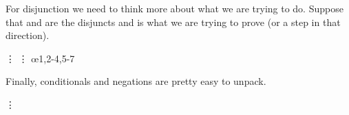 \begin{fitchrule}
  \label{def:unpacking-conjunctions}
  \leavevmode
  \vspace{-0.9\baselineskip}
  \begin{fitchproof}
     {\ephi\eand\epsi} 
     {\ephi}
     {\epsi}
  \end{fitchproof}  
\end{fitchrule}

For disjunction we need to think more about what we are trying to do. Suppose
that \ephi and \epsi are the disjuncts and \echi is what we are trying to
prove (or a step in that direction).

\begin{fitchrule}
  \label{def:unpacking-disjunctions}
  \leavevmode
  \vspace{-0.9\baselineskip}
  \begin{fitchproof}
     {\ephi\eor\epsi}
    \open
     {\ephi} 
     {\vdots}
     {\echi}
    \close    
    \open
     {\ephi} 
     {\vdots}
     {\echi}
    \close
     {\echi} \oe{1,2-4,5-7}
  \end{fitchproof}  
\end{fitchrule}

Finally, conditionals and negations are pretty easy to unpack.

 {
  
\begin{fitchrule}
  \label{def:unpacking-negationss}
  \leavevmode
  \vspace{-0.9\baselineskip}
  \begin{fitchproof}
     {\enot\ephi} 
     {\vdots}
     {\ephi}
     {\ebot} 
  \end{fitchproof}      
\end{fitchrule}

}

